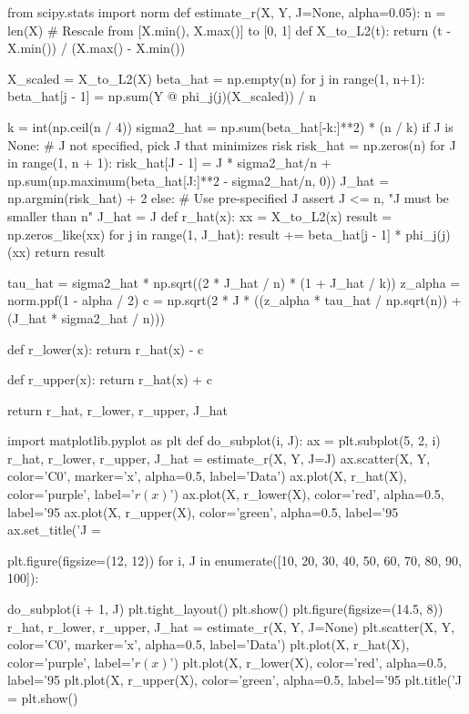 \begin{python}
from scipy.stats import norm
def estimate_r(X, Y, J=None, alpha=0.05):
    n = len(X)
    # Rescale from [X.min(), X.max()] to [0, 1]
    def X_to_L2(t):
        return (t - X.min()) / (X.max() - X.min())
    
    X_scaled = X_to_L2(X)
    beta_hat = np.empty(n)
    for j in range(1, n+1):
        beta_hat[j - 1] = np.sum(Y @ phi_{j}(j)(X_scaled)) / n
        
    k = int(np.ceil(n / 4))
    sigma2_hat = np.sum(beta_hat[-k:]**2) * (n / k)
    if J is None:
        # J not specified, pick J that minimizes risk
        risk_hat = np.zeros(n)
        for J in range(1, n + 1):
            risk_hat[J - 1] = J * sigma2_hat/n + np.sum(np.maximum(beta_hat[J:]**2 
                - sigma2_hat/n, 0))
        J_hat = np.argmin(risk_hat) + 2
    else:
        # Use pre-specified J
        assert J <= n, "J must be smaller than n"
        J_hat = J
    def r_hat(x):
        xx = X_to_L2(x)
        result = np.zeros_like(xx)
        for j in range(1, J_hat):
            result += beta_hat[j - 1] * phi_{j}(j)(xx)
        return result
        
    tau_hat = sigma2_hat * np.sqrt((2 * J_hat / n) * (1 + J_hat / k))
    z_alpha = norm.ppf(1 - alpha / 2)
    c = np.sqrt(2 * J * ((z_alpha * tau_hat / np.sqrt(n)) + (J_hat * sigma2_hat / n)))
    
    def r_lower(x):
        return r_hat(x) - c
    
    def r_upper(x):
        return r_hat(x) + c
            
    return r_hat, r_lower, r_upper, J_hat
\end{python}

\begin{python}
import matplotlib.pyplot as plt
def do_subplot(i, J):
    ax = plt.subplot(5, 2, i)
    r_hat, r_lower, r_upper, J_hat = estimate_r(X, Y, J=J)
    ax.scatter(X, Y, color='C0', marker='x', alpha=0.5, label='Data')
    ax.plot(X, r_hat(X), color='purple', label='$r(x)$')
    ax.plot(X, r_lower(X), color='red', alpha=0.5, label='95%
    ax.plot(X, r_upper(X), color='green', alpha=0.5, label='95%
    ax.set_title('J = %
    
plt.figure(figsize=(12, 12))
for i, J in enumerate([10, 20, 30, 40, 50, 60, 70, 80, 90, 100]):
    
    do_subplot(i + 1, J)
plt.tight_layout()
plt.show()
plt.figure(figsize=(14.5, 8))
r_hat, r_lower, r_upper, J_hat = estimate_r(X, Y, J=None)
plt.scatter(X, Y, color='C0', marker='x', alpha=0.5, label='Data')
plt.plot(X, r_hat(X), color='purple', label='$r(x)$')
plt.plot(X, r_lower(X), color='red', alpha=0.5, label='95%
plt.plot(X, r_upper(X), color='green', alpha=0.5, label='95%
plt.title('J = %
plt.show()
\end{python}

